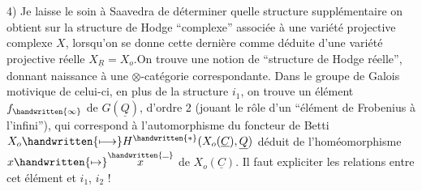 4) Je laisse le soin à Saavedra de déterminer quelle structure supplémentaire on obtient sur la structure de Hodge ``complexe'' associée à une variété projective  complexe $X$, lorsqu'on se donne cette dernière comme déduite d'une variété projective réelle $X_{\underline{R}}=X_o$.On trouve une notion de ``structure de Hodge réelle'', donnant naissance à une $\otimes$-catégorie correspondante. Dans le groupe de Galois motivique de celui-ci, en plus de la structure $i_1$, on trouve un élément $f_{\handwritten{\infty}}$ de $G(\underline{Q})$,  d'ordre 2 (jouant le rôle d'un ``élément de Frobenius à l'infini''), qui correspond à l'automorphisme du foncteur de Betti $X_o\handwritten{\longmapsto} H^{\handwritten{*}}(X_o(\underline{C}),\underline{Q})$ déduit de l'homéomorphisme $x\handwritten{\mapsto}\overset{\handwritten{\rule{.55em}{.35pt}}}{x}$ de $X_o(\underline{C})$. Il faut expliciter les relations entre cet élément et $i_1$, $i_2$ !

